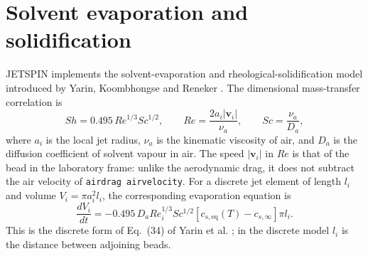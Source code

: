 
\section{Solvent evaporation and solidification\label{sec:Evaporation}}

JETSPIN implements the solvent-evaporation and rheological-solidification
model introduced by Yarin, Koombhongse and Reneker
\cite{yarin2001bending}.  The dimensional mass-transfer correlation is
\begin{equation}
 Sh=0.495\,Re^{1/3}Sc^{1/2},
 \qquad
 Re=\frac{2a_i|\mathbf{v}_i|}{\nu_a},
 \qquad
 Sc=\frac{\nu_a}{D_a},
 \label{eq:evap-sherwood}
\end{equation}
where $a_i$ is the local jet radius, $\nu_a$ is the kinematic viscosity
of air, and $D_a$ is the diffusion coefficient of solvent vapour in air.
The speed $|\mathbf{v}_i|$ in $Re$ is that of the bead in the laboratory
frame: unlike the aerodynamic drag, it does not subtract the air velocity
of \texttt{airdrag airvelocity}.
For a discrete jet element of length $l_i$ and volume
$V_i=\pi a_i^2l_i$, the corresponding evaporation equation is
\begin{equation}
 \frac{dV_i}{dt}=
 -0.495\,D_a Re_i^{1/3}Sc^{1/2}
 \left[c_{s,\mathrm{eq}}(T)-c_{s,\infty}\right]\pi l_i .
 \label{eq:evap-volume-dimensional}
\end{equation}
This is the discrete form of Eq.~(34) of Yarin et al.
\cite{yarin2001bending}; in the discrete model $l_i$ is the distance
between adjoining beads.

